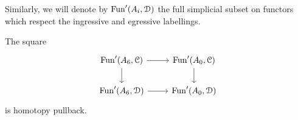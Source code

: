 \documentclass[main.tex]{subfiles}
\begin{document}
Similarly, we will denote by $\mathrm{Fun}'(A_{i}, \mathcal{D})$ the full simplicial subset on functors which respect the ingressive and egressive labellings.

\begin{lemma}
  \label{lemma:homotopy_pullback_for_filling_procedure}
  The square
  \begin{equation*}
    \begin{tikzcd}
      \Fun'(A_{6}, \category{C})
      \arrow[r]
      \arrow[d]
      & \Fun'(A_{0}, \category{C})
      \arrow[d]
      \\
      \Fun'(A_{6}, \category{D})
      \arrow[r]
      & \Fun'(A_{0}, \category{D})
    \end{tikzcd}
  \end{equation*}
  is homotopy pullback.
\end{lemma}
\end{document}
